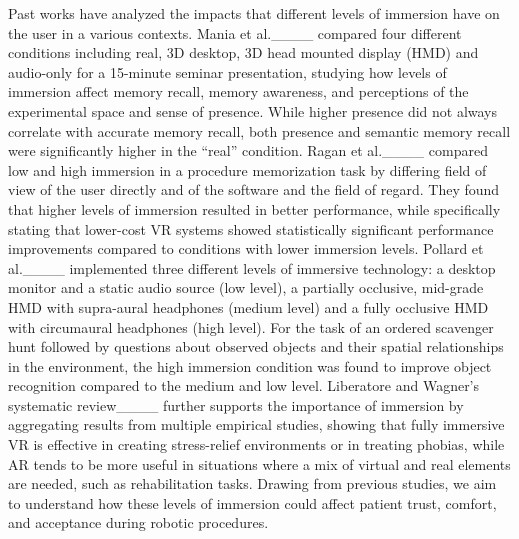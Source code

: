 Past works have analyzed the impacts that different levels of immersion have on the user in a various contexts. Mania et al.____ compared four different conditions including real, 3D desktop, 3D head mounted display (HMD) and audio-only for a 15-minute seminar presentation, studying how levels of immersion affect memory recall, memory awareness, and perceptions of the experimental space and sense of presence. While higher presence did not always correlate with accurate memory recall, both presence and semantic memory recall were significantly higher in the ``real'' condition. Ragan et al.____ compared low and high immersion in a procedure memorization task by differing field of view of the user directly and of the software and the field of regard. They found that higher levels of immersion resulted in better performance, while specifically stating that lower-cost VR systems showed statistically significant performance improvements compared to conditions with lower immersion levels. Pollard et al.____ implemented three different levels of  immersive technology: a desktop monitor and a static audio source (low level), a partially occlusive, mid-grade HMD with supra-aural headphones (medium level) and a fully occlusive HMD with circumaural headphones (high level). For the task of an ordered scavenger hunt followed by questions about observed objects and their spatial relationships in the environment, the high immersion condition was found to improve object recognition compared to the medium and low level.
Liberatore and Wagner’s systematic review____ further supports the importance of immersion by aggregating results from multiple empirical studies, showing that fully immersive VR is effective in creating stress-relief environments or in treating phobias, while AR tends to be more useful in situations where a mix of virtual and real elements are needed, such as rehabilitation tasks.
Drawing from previous studies, we aim to understand how these levels of immersion could affect patient trust, comfort, and acceptance during robotic procedures.